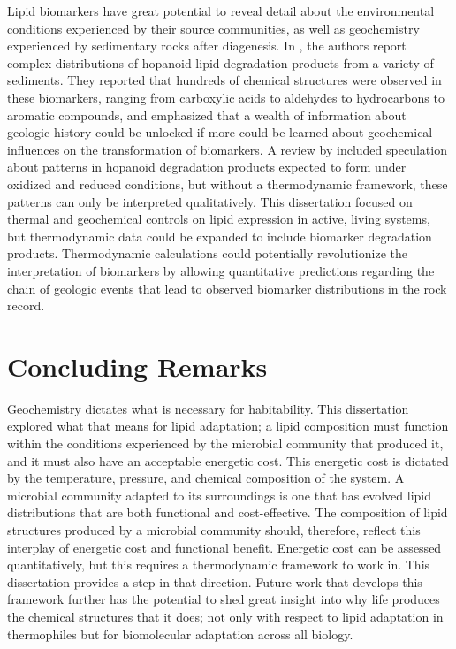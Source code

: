 Lipid biomarkers have great potential to reveal detail about the environmental conditions experienced by their source communities, as well as geochemistry experienced by sedimentary rocks after diagenesis. In \cite{ourisson1979hopanoids}, the authors report complex distributions of hopanoid lipid degradation products from a variety of sediments. They reported that hundreds of chemical structures were observed in these biomarkers, ranging from carboxylic acids to aldehydes to hydrocarbons to aromatic compounds, and emphasized that a wealth of information about geologic history could be unlocked if more could be learned about geochemical influences on the transformation of biomarkers. A review by \cite{ourisson1992hopanoids} included speculation about patterns in hopanoid degradation products expected to form under oxidized and reduced conditions, but without a thermodynamic framework, these patterns can only be interpreted qualitatively. This dissertation focused on thermal and geochemical controls on lipid expression in active, living systems, but thermodynamic data could be expanded to include biomarker degradation products. Thermodynamic calculations could potentially revolutionize the interpretation of biomarkers by allowing quantitative predictions regarding the chain of geologic events that lead to observed biomarker distributions in the rock record.

\section{Concluding Remarks}
Geochemistry dictates what is necessary for habitability. This dissertation explored what that means for lipid adaptation; a lipid composition must function within the conditions experienced by the microbial community that produced it, and it must also have an acceptable energetic cost. This energetic cost is dictated by the temperature, pressure, and chemical composition of the system. A microbial community adapted to its surroundings is one that has evolved lipid distributions that are both functional and cost-effective. The composition of lipid structures produced by a microbial community should, therefore, reflect this interplay of energetic cost and functional benefit. Energetic cost can be assessed quantitatively, but this requires a thermodynamic framework to work in. This dissertation provides a step in that direction. Future work that develops this framework further has the potential to shed great insight into why life produces the chemical structures that it does; not only with respect to lipid adaptation in thermophiles but for biomolecular adaptation across all biology.

